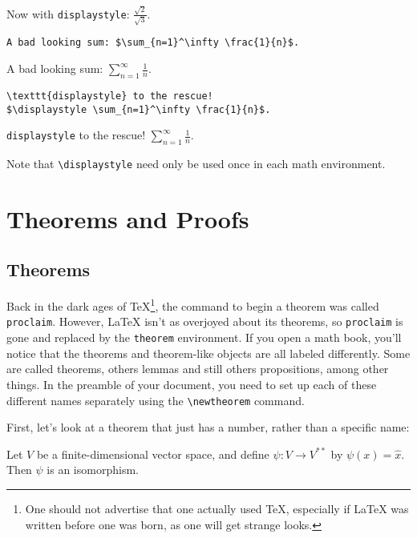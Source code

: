 Now with \texttt{displaystyle}: $\displaystyle\frac{\sqrt{2}}{\sqrt{3}}$.

\begin{verbatim}
A bad looking sum: $\sum_{n=1}^\infty \frac{1}{n}$.
\end{verbatim}

A bad looking sum: $\sum_{n=1}^\infty \frac{1}{n}$.

\begin{verbatim}
\texttt{displaystyle} to the rescue!
$\displaystyle \sum_{n=1}^\infty \frac{1}{n}$.
\end{verbatim}

\texttt{displaystyle} to the rescue! $\displaystyle \sum_{n=1}^\infty
\frac{1}{n}$.

Note that \verb|\displaystyle| need only be used once in each math
environment.

\section{Theorems and Proofs}
\label{sec:theorems-proofs}

\subsection{Theorems}
\label{sec:theorems}

Back in the dark ages of \TeX{}\footnote{One should not advertise that
one actually used \TeX{}, especially if \LaTeX{} was written before
one was born, as one will get strange looks.}, the command to begin a
theorem was called \texttt{proclaim}.  However, \LaTeX{} isn't as
overjoyed about its theorems, so \texttt{proclaim} is gone and
replaced by the \texttt{theorem} environment.  If you open a math
book, you'll notice that the theorems and theorem-like objects are all
labeled differently.  Some are called theorems, others lemmas and
still others propositions, among other things.  In the preamble of
your document, you need to set up each of these different names
separately using the \verb|\newtheorem| command.

First, let's look at a theorem that just has a number, rather than a
specific name:
\begin{theorem}
  Let $V$ be a finite-dimensional vector space, and define
  $\psi:V\rightarrow V^{**}$ by $\psi(x)=\hat{x}$. Then $\psi$ is an
  isomorphism.
\end{theorem}

